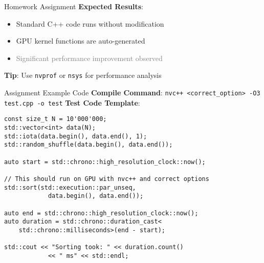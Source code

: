 \begin{frame}{Homework Assignment}
	\textbf{Expected Results}:
	\begin{itemize}
		\item Standard C++ code runs without modification
		\item GPU kernel functions are auto-generated
		\item \textcolor{gray}{Significant performance improvement observed}
	\end{itemize}

	\vspace{0.5em}
	\textbf{Tip}: Use \texttt{nvprof} or \texttt{nsys} for performance analysis
\end{frame}

\begin{frame}[fragile]{Assignment Example Code}
	\textbf{Compile Command}: \verb|nvc++ <correct_option> -O3 test.cpp -o test|
	\textbf{Test Code Template}:

	\begin{verbatim}
const size_t N = 10'000'000;
std::vector<int> data(N);
std::iota(data.begin(), data.end(), 1);
std::random_shuffle(data.begin(), data.end());

auto start = std::chrono::high_resolution_clock::now();

// This should run on GPU with nvc++ and correct options
std::sort(std::execution::par_unseq,
            data.begin(), data.end());

auto end = std::chrono::high_resolution_clock::now();
auto duration = std::chrono::duration_cast<
    std::chrono::milliseconds>(end - start);

std::cout << "Sorting took: " << duration.count()
            << " ms" << std::endl;
    \end{verbatim}

\end{frame}
